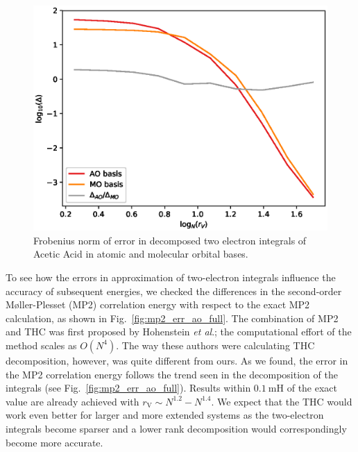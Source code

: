 \begin{figure}[tb]
\includegraphics[width=\columnwidth]{figures/thc_rccsd/thc_err_ao_vs_mo}
\caption{Frobenius norm of error in decomposed two electron integrals of Acetic 
Acid in atomic and molecular orbital bases.
\label{fig:thc_err_ao_vs_mo}}
\end{figure}
%
To see how the errors in approximation of two-electron 
integrals influence the accuracy of subsequent energies, we checked 
the differences in the second-order M{\o}ller-Plesset (MP2) correlation
energy with respect to the exact MP2 calculation, as shown in 
Fig.~\ref{fig:mp2_err_ao_full}.  The combination
of MP2 and THC was first proposed by Hohenstein \emph{et
al}.\cite{hohenstein_thc2}; the computational effort of the method scales 
as $O(N^4)$.  The way these authors were calculating THC decomposition, however, 
was quite different from ours. As we found, the error in the MP2 correlation 
energy follows the trend seen in the decomposition of the integrals (see 
Fig.~\ref{fig:mp2_err_ao_full}). Results within $0.1~\mathrm{mH}$
of the exact value are already achieved with
$r_\mathrm{V} \sim N^{1.2} - N^{1.4}$.
We expect that the THC would work even better for larger and more extended 
systems as the two-electron integrals become sparser and a lower rank 
decomposition would correspondingly become more accurate.
%
